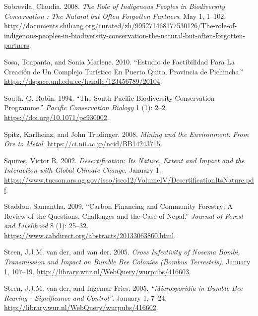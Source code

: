 \begin{CSLReferences}{1}{1}
Sobrevila, Claudia. 2008. \emph{The Role of Indigenous Peoples in
Biodiversity Conservation : The Natural but Often Forgotten Partners}.
May 1, 1--102.
\url{http://documents.shihang.org/curated/zh/995271468177530126/The-role-of-indigenous-peoples-in-biodiversity-conservation-the-natural-but-often-forgotten-partners}.

Sosa, Toapanta, and Sonia Marlene. 2010. {``Estudio de Factibilidad Para
La Creación de Un Complejo Turístico En Puerto Quito, Provincia de
Pichincha.''} \url{https://dspace.unl.edu.ec/handle/123456789/20104}.

South, G. Robin. 1994. {``The South Pacific Biodiversity Conservation
Programme.''} \emph{Pacific Conservation Biology} 1 (1): 2--2.
\url{https://doi.org/10.1071/pc930002}.

Spitz, Karlheinz, and John Trudinger. 2008. \emph{Mining and the
Environment: From Ore to Metal}.
\url{https://ci.nii.ac.jp/ncid/BB14243715}.

Squires, Victor R. 2002. \emph{Desertification: Its Nature, Extent and
Impact and the Interaction with Global Climate Change}. January 1.
\url{https://www.tucson.ars.ag.gov/isco/isco12/VolumeIV/DesertificationItsNature.pdf}.

Staddon, Samantha. 2009. {``Carbon Financing and Community Forestry: A
Review of the Questions, Challenges and the Case of Nepal.''}
\emph{Journal of Forest and Livelihood} 8 (1): 25--32.
\url{https://www.cabdirect.org/abstracts/20133063860.html}.

{Steen, J.J.M. van der, and van der}. 2005. \emph{Cross Infectivity of
Nosema Bombi, Transmission and Impact on Bumble Bee Colonies (Bombus
Terrestris)}. January 1, 107--19.
\url{http://library.wur.nl/WebQuery/wurpubs/416603}.

Steen, J.J.M. van der, and Ingemar Fries. 2005. \emph{{``Microsporidia
in Bumble Bee Rearing - Significance and Control''}}. January 1, 7--24.
\url{http://library.wur.nl/WebQuery/wurpubs/416602}.


\end{CSLReferences}
